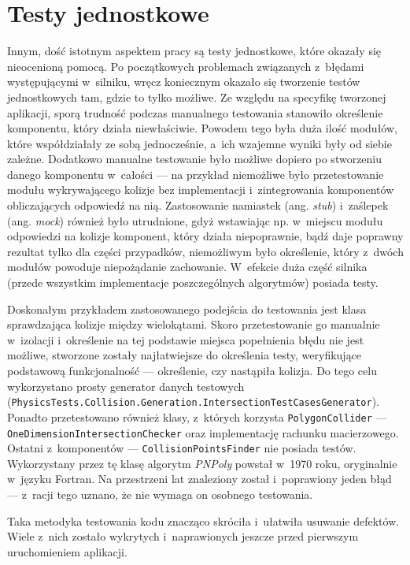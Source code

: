 \section*{Testy jednostkowe}
Innym, dość istotnym aspektem pracy są testy jednostkowe, które okazały się nieocenioną pomocą. Po początkowych problemach związanych z~błędami występującymi w~silniku, wręcz koniecznym okazało się tworzenie testów jednostkowych tam, gdzie to tylko możliwe.
Ze względu na specyfikę tworzonej aplikacji, sporą trudność podczas manualnego testowania stanowiło określenie komponentu, który działa niewłaściwie. Powodem tego była duża ilość modułów, które współdziałały ze sobą jednocześnie, a~ich wzajemne wyniki były od siebie zależne. Dodatkowo manualne testowanie było możliwe dopiero po stworzeniu danego komponentu w~całości --- na przykład niemożliwe było przetestowanie modułu wykrywającego kolizje bez implementacji i~zintegrowania komponentów obliczających odpowiedź na nią. Zastosowanie namiastek (ang. \textit{stub}) i~zaślepek (ang. \textit{mock}) również było utrudnione, gdyż wstawiając np. w~miejscu modułu odpowiedzi na kolizje komponent, który działa niepoprawnie, bądź daje poprawny rezultat tylko dla części przypadków, niemożliwym było określenie, który z~dwóch modułów powoduje niepożądanie zachowanie. W~efekcie duża część silnika (przede wszystkim implementacje poszczególnych algorytmów) posiada testy. 

Doskonałym przykładem zastosowanego podejścia do testowania jest klasa sprawdzająca kolizje między wielokątami. Skoro przetestowanie go manualnie w~izolacji i~określenie na tej podstawie miejsca popełnienia błędu nie jest możliwe, stworzone zostały najłatwiejsze do określenia testy, weryfikujące podstawową funkcjonalność --- określenie, czy nastąpiła kolizja. Do tego celu wykorzystano prosty generator danych testowych (\verb|PhysicsTests.Collision.Generation.IntersectionTestCasesGenerator|). Ponadto przetestowano również klasy, z~których korzysta \verb|PolygonCollider| --- \verb|OneDimensionIntersectionChecker| oraz implementację rachunku macierzowego. Ostatni z~komponentów --- \verb|CollisionPointsFinder| nie posiada testów. Wykorzystany przez tę klasę algorytm \textit{PNPoly} powstał w~1970 roku, oryginalnie w~języku Fortran. Na przestrzeni lat znaleziony został i~poprawiony jeden błąd \cite{bib:pnpoly} --- z~racji tego uznano, że nie wymaga on osobnego testowania.

Taka metodyka testowania kodu znacząco skróciła i~ułatwiła usuwanie defektów. Wiele z~nich zostało wykrytych i~naprawionych jeszcze przed pierwszym uruchomieniem aplikacji.

